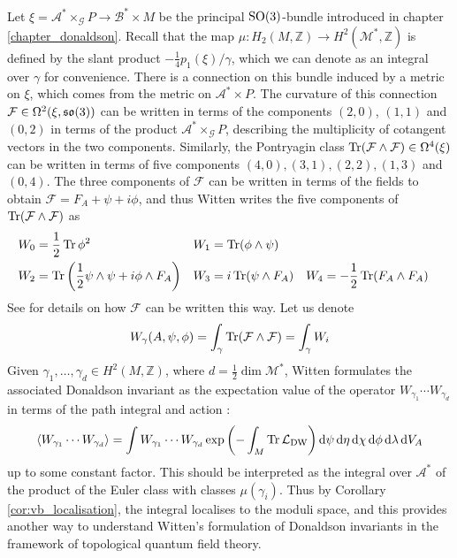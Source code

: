 Let $\xi = \mathcal{A}^*\times_\mathcal{G} P \to \mathcal{B}^*\times M$ be the
principal $\operatorname{SO}(3)$-bundle introduced in chapter \ref{chapter_donaldson}. 
Recall that the map $\mu : H_2(M,\mathbb{Z}) \to H^2(\mathcal{M}^*,\mathbb{Z})$ 
is defined by the slant product $-\frac{1}{4}p_1(\xi) / \gamma$, which we can
denote as an integral over $\gamma$ for convenience.
There is a connection on this bundle induced by a metric on $\xi$, which comes
from the metric on $\mathcal{A}^*\times P$. 
The curvature of this connection 
$\mathcal{F}\in \Omega^{2}(\xi, \operatorname{\mathfrak{so}}(3))$ can be written in terms of the
components $(2,0)$,  $(1,1)$ and  $(0,2)$ in terms of the product
$\mathcal{A}^*\times_{\mathcal{G}} P$, describing
the multiplicity of cotangent vectors in the two components. 
Similarly, the Pontryagin class 
$\operatorname{Tr}(\mathcal{F}\wedge \mathcal{F}) \in \Omega^4(\xi)$ can be written
in terms of five components $(4,0),(3,1),(2,2),(1,3)$ and  $(0,4)$. 
The three components of $\mathcal{F}$ can be written in terms of the fields 
to obtain $\mathcal{F} = F_A + \psi + i\phi$, and thus Witten writes the five
components of $\operatorname{Tr}(\mathcal{F}\wedge \mathcal{F})$ as 
\begin{align*}
	W_0 &= \frac{1}{2} \Tr \phi^2 && W_1 = \Tr(\phi \wedge \psi)  \\
	W_2 &= \Tr \paren{\frac{1}{2}\psi\wedge \psi + i\phi \wedge F_A} 
		&& W_3 = i\Tr(\psi \wedge F_A) 
		&& W_4 = -\frac{1}{2}\Tr(F_A\wedge F_A)
\end{align*}
See \cite{witten_operators} for details on how $\mathcal{F}$ can be written this 
way. Let us denote 
\[
W_{\gamma}(A,\psi,\phi) = \int_{\gamma} \operatorname{Tr}(\mathcal{F}\wedge \mathcal{F}) 
=\int_\gamma W_i
\] 
Given $\gamma_1,\ldots,\gamma_d \in H^2(M,\mathbb{Z})$, where 
$d = \frac{1}{2}\dim \mathcal{M}^*$,
Witten formulates the associated Donaldson invariant as the expectation value of
the operator $W_{\gamma_1} \cdots W_{\gamma_d}$ in terms of the path
integral and action \cite[eq. 3.40]{wittenTQFT}:
\[
\gen{W_{\gamma_1}\cdots W_{\gamma_d}}
= \int W_{\gamma_1}\cdots W_{\gamma_d} 
\exp \paren{-\int_M \Tr \mathcal{L}_{\text{DW}} }
\odif{\psi}\odif{\eta} \odif{\chi} \odif{\phi}\odif{\lambda}\odif{V_A} 
\] 
up to some constant factor. 
This should be interpreted as the integral over $\mathcal{A}^*$ of the product
of the Euler class with classes $\mu(\gamma_i)$. Thus by Corollary 
\ref{cor:vb_localisation}, the integral localises to the moduli space, and this
provides another way to understand Witten's formulation of
Donaldson invariants in the framework of topological quantum field theory.

